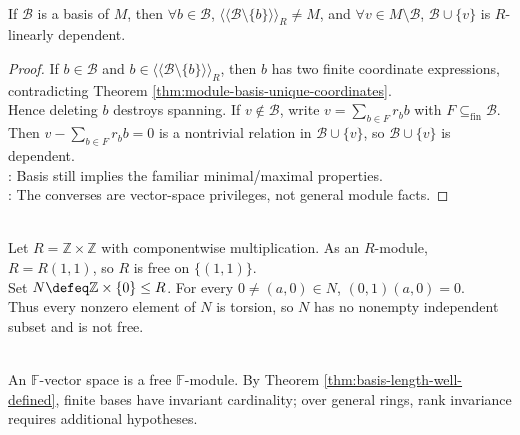 \begin{proposition} \label{prop:module-basis-minimal-maximal} \\
If $\mathcal{B}$ is a basis of $M$, then $\forall b\in\mathcal{B}$, $\langle\!\langle\mathcal{B}\setminus\{b\}\rangle\!\rangle_R\neq M$, and $\forall v\in M\setminus\mathcal{B}$, $\mathcal{B}\cup\{v\}$ is $R$-linearly dependent.
\begin{proof}
If $b\in\mathcal{B}$ and $b\in\langle\!\langle\mathcal{B}\setminus\{b\}\rangle\!\rangle_R$, then $b$ has two finite coordinate expressions, contradicting Theorem \ref{thm:module-basis-unique-coordinates}.\\
Hence deleting $b$ destroys spanning. If $v\notin\mathcal{B}$, write $v=\sum_{b\in F}r_bb$ with $F\subseteq_{\operatorname{fin}}\mathcal{B}$.\\
Then $v-\sum\limits_{b\in F}r_bb=0$ is a nontrivial relation in $\mathcal{B}\cup\{v\}$, so $\mathcal{B}\cup\{v\}$ is dependent.\\
: Basis still implies the familiar minimal/maximal properties.\\
: The converses are vector-space privileges, not general module facts.
\end{proof}
\end{proposition}

\begin{example} \label{ex:free-module-with-nonfree-submodule} \\
Let $R=\mathbb{Z}\times\mathbb{Z}$ with componentwise multiplication. As an $R$-module, $R=R(1,1)$, so $R$ is free on $\{(1,1)\}$.\\
Set $N\defeq\mathbb{Z}\times\{0\}\leq R$. For every $0\neq(a,0)\in N$, $(0,1)(a,0)=0$.\\
Thus every nonzero element of $N$ is torsion, so $N$ has no nonempty independent subset and is not free.
\end{example}

\begin{perspective} \label{per:dimension-as-field-case-of-rank} \\
An $\mathbb{F}$-vector space is a free $\mathbb{F}$-module. By Theorem \ref{thm:basis-length-well-defined}, finite bases have invariant cardinality; over general rings, rank invariance requires additional hypotheses.
\end{perspective}

